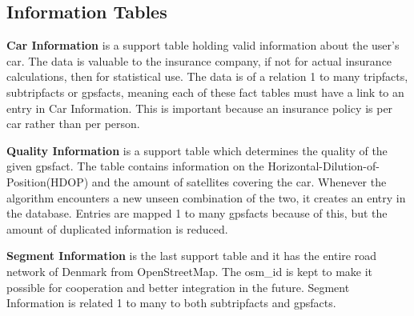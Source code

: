 \subsection{Information Tables}

\textbf{Car Information} is a support table holding valid information about the user's car. The data is valuable to the insurance company, if not for actual insurance calculations, then for statistical use. The data is of a relation 1 to many tripfacts, subtripfacts or gpsfacts, meaning each of these fact tables must have a link to an entry in Car Information. This is important because an insurance policy  is per car rather than per person.

\textbf{Quality Information} is a support table which determines the quality of the given gpsfact. The table contains information on the Horizontal-Dilution-of-Position(HDOP) and the amount of satellites covering the car. Whenever the algorithm encounters a new unseen combination of the two, it creates an entry in the database. Entries are mapped 1 to many gpsfacts because of this, but  the amount of duplicated information is reduced.

\textbf{Segment Information} is the last support table and it has the entire road network of Denmark from OpenStreetMap\cite{osm}. The osm\_id is kept to make it possible for cooperation and better integration in the future. Segment Information is related 1 to many to both subtripfacts and gpsfacts.